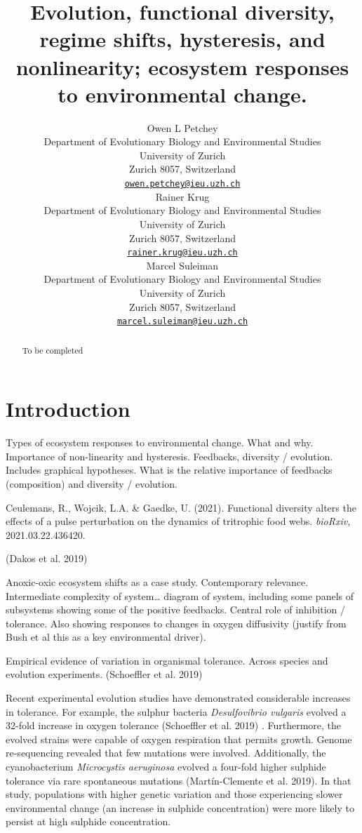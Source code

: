\documentclass{article}
\title{Evolution, functional diversity, regime shifts, hysteresis, and
nonlinearity; ecosystem responses to environmental change.}
\author{
    Owen L Petchey
   \\
    Department of Evolutionary Biology and Environmental Studies \\
    University of Zurich \\
  Zurich 8057, Switzerland \\
  \texttt{\href{mailto:owen.petchey@ieu.uzh.ch}{\nolinkurl{owen.petchey@ieu.uzh.ch}}} \\
   \And
    Rainer Krug
   \\
    Department of Evolutionary Biology and Environmental Studies \\
    University of Zurich \\
  Zurich 8057, Switzerland \\
  \texttt{\href{mailto:rainer.krug@ieu.uzh.ch}{\nolinkurl{rainer.krug@ieu.uzh.ch}}} \\
   \And
    Marcel Suleiman
   \\
    Department of Evolutionary Biology and Environmental Studies \\
    University of Zurich \\
  Zurich 8057, Switzerland \\
  \texttt{\href{mailto:marcel.suleiman@ieu.uzh.ch}{\nolinkurl{marcel.suleiman@ieu.uzh.ch}}} \\
  }
\begin{document}
\maketitle

\def\tightlist{}


\begin{abstract}
To be completed
\end{abstract}


\hypertarget{introduction}{%
\section{Introduction}\label{introduction}}

Types of ecosystem responses to environmental change. What and why.
Importance of non-linearity and hysteresis. Feedbacks, diversity /
evolution. Includes graphical hypotheses. What is the relative
importance of feedbacks (composition) and diversity / evolution.

Ceulemans, R., Wojcik, L.A. \& Gaedke, U. (2021). Functional diversity
alters the effects of a pulse perturbation on the dynamics of tritrophic
food webs. \emph{bioRxiv}, 2021.03.22.436420.

(Dakos et al. 2019)

Anoxic-oxic ecosystem shifts as a case study. Contemporary relevance.
Intermediate complexity of system\ldots{} diagram of system, including
some panels of subsystems showing some of the positive feedbacks.
Central role of inhibition / tolerance. Also showing responses to
changes in oxygen diffusivity (justify from Bush et al this as a key
environmental driver).

Empirical evidence of variation in organismal tolerance. Across species
and evolution experiments. (Schoeffler et al. 2019)

Recent experimental evolution studies have demonstrated considerable
increases in tolerance. For example, the sulphur bacteria
\emph{Desulfovibrio vulgaris} evolved a 32-fold increase in oxygen
tolerance (Schoeffler et al. 2019) . Furthermore, the evolved strains
were capable of oxygen respiration that permits growth. Genome
re-sequencing revealed that few mutations were involved. Additionally,
the cyanobacterium \emph{Microcystis aeruginosa} evolved a four-fold
higher sulphide tolerance via rare spontaneous mutations
(Martín-Clemente et al. 2019). In that study, populations with higher
genetic variation and those experiencing slower environmental change (an
increase in sulphide concentration) were more likely to persist at high
sulphide concentration.
\end{document}
